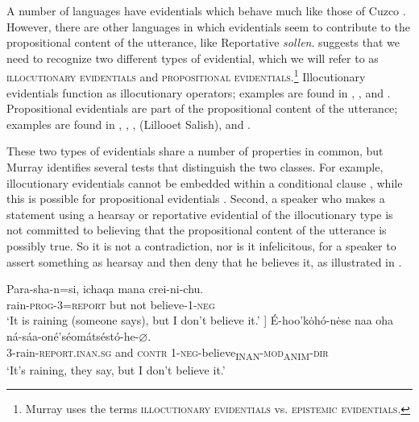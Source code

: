 A number of languages have evidentials which behave much like those of Cuzco . However, there are other languages in which evidentials seem to contribute to the propositional content of the utterance, like  Reportative \textit{sollen}. \citet{Murray2010} suggests that we need to recognize two different types of evidential, which we will refer to as \textsc{illocutionary evidentials} and \textsc{propositional evidentials}.\footnote{Murray uses the terms \textsc{illocutionary evidentials} vs. \textsc{epistemic evidentials}.} Illocutionary evidentials function as illocutionary operators; examples are found in , , and . Propositional evidentials are part of the propositional content of the utterance; examples are found in , , ,  (Lillooet Salish), and .



These two types of evidentials share a number of properties in common, but Murray identifies several tests that distinguish the two classes. For example, illocutionary evidentials cannot be embedded within a conditional clause , while this is possible for propositional evidentials . Second, a speaker who makes a statement using a hearsay or reportative evidential of the illocutionary type is not committed to believing that the propositional content of the utterance is possibly true. So it is not a contradiction, nor is it infelicitous, for a speaker to assert something as hearsay and then deny that he believes it, as illustrated in .


\largerpage
\ea \label{ex:17.11}
\ea  \gll Para-sha-n=si,  ichaqa  mana  crei-ni-chu.\\
rain-\textsc{prog}-3=\textsc{report}  but  not  believe-1-\textsc{neg}\\
\glt ‘It is raining (someone says), but I don’t believe it.’ \newline  [Cuzco \ili{Quechua}; \citet[194]{Faller2002}]
\ex \gll  É-hoo'kȯhó-n\.ese  naa  oha  ná-sáa-oné'séomátséstó-he-⌀.\\
3-rain-\textsc{report}.\textsc{inan.sg}  and  \textsc{contr}  1-\textsc{neg}-believe\textsubscript{INAN}-\textsc{mod\textsubscript{A}}\textsubscript{NIM}-\textsc{dir}\\
\glt ‘It’s raining, they say, but I don’t believe it.’ 
\z \z


